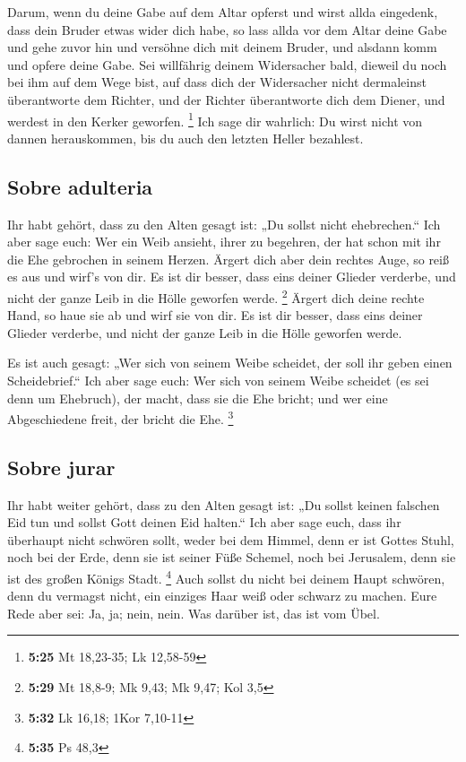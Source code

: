  Darum, wenn du deine Gabe auf dem Altar opferst und
wirst allda eingedenk, dass dein Bruder etwas wider dich habe,
 so lass allda vor dem Altar deine Gabe und gehe zuvor
hin und versöhne dich mit deinem Bruder, und alsdann komm und opfere
deine Gabe.  Sei willfährig deinem Widersacher bald,
dieweil du noch bei ihm auf dem Wege bist, auf dass dich der Widersacher
nicht dermaleinst überantworte dem Richter, und der Richter überantworte
dich dem Diener, und werdest in den Kerker geworfen. \footnote{\textbf{5:25}
  Mt 18,23-35; Lk 12,58-59}  Ich sage dir wahrlich: Du
wirst nicht von dannen herauskommen, bis du auch den letzten Heller
bezahlest.

\hypertarget{sobre-adulteria}{%
\subsection{Sobre adulteria}\label{sobre-adulteria}}

 Ihr habt gehört, dass zu den Alten gesagt ist: „Du
sollst nicht ehebrechen.``  Ich aber sage euch: Wer ein
Weib ansieht, ihrer zu begehren, der hat schon mit ihr die Ehe gebrochen
in seinem Herzen.  Ärgert dich aber dein rechtes Auge, so
reiß es aus und wirf's von dir. Es ist dir besser, dass eins deiner
Glieder verderbe, und nicht der ganze Leib in die Hölle geworfen werde.
\footnote{\textbf{5:29} Mt 18,8-9; Mk 9,43; Mk 9,47; Kol 3,5}
 Ärgert dich deine rechte Hand, so haue sie ab und wirf
sie von dir. Es ist dir besser, dass eins deiner Glieder verderbe, und
nicht der ganze Leib in die Hölle geworfen werde.

 Es ist auch gesagt: „Wer sich von seinem Weibe scheidet,
der soll ihr geben einen Scheidebrief.``  Ich aber sage
euch: Wer sich von seinem Weibe scheidet (es sei denn um Ehebruch), der
macht, dass sie die Ehe bricht; und wer eine Abgeschiedene freit, der
bricht die Ehe. \footnote{\textbf{5:32} Lk 16,18; 1Kor 7,10-11}

\hypertarget{sobre-jurar}{%
\subsection{Sobre jurar}\label{sobre-jurar}}

 Ihr habt weiter gehört, dass zu den Alten gesagt ist:
„Du sollst keinen falschen Eid tun und sollst Gott deinen Eid halten.``
 Ich aber sage euch, dass ihr überhaupt nicht schwören
sollt, weder bei dem Himmel, denn er ist Gottes Stuhl, 
noch bei der Erde, denn sie ist seiner Füße Schemel, noch bei Jerusalem,
denn sie ist des großen Königs Stadt. \footnote{\textbf{5:35} Ps 48,3}
 Auch sollst du nicht bei deinem Haupt schwören, denn du
vermagst nicht, ein einziges Haar weiß oder schwarz zu machen.
 Eure Rede aber sei: Ja, ja; nein, nein. Was darüber ist,
das ist vom Übel.

